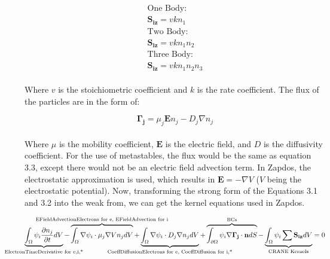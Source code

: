 \documentclass[final]{report}
\begin{document}
  \begin{equation}
    \begin{gathered}
    \text{One Body:} \\
    \mathbf{S_{iz}}=vkn_{1} \\
    \text{Two Body:} \\
    \mathbf{S_{iz}}=vkn_{1}n_{2} \\
    \text{Three Body:} \\
    \mathbf{S_{iz}}=vkn_{1}n_{2}n_{3}
    \end{gathered}
  \end{equation}
  \\
  Where $v$ is the stoichiometric coefficient and $k$ is the rate coefficient. The flux of the particles are in the form of:

  \begin{equation}
      \mathbf{\Gamma_{j}}=\mu_{j}\mathbf{E}n_{j}-D_{j}\nabla n_{j}
  \end{equation}
  \\
  Where $\mu$ is the mobility coefficient, $\textbf{E}$ is the electric field, and $D$ is the diffusivity coefficient. For the use of metastables, the flux would be the same as equation 3.3, except there would not be an electric field advection term. In Zapdos, the electrostatic approximation is used, which results in $\textbf{E}=-\nabla V$ ($V$ being the electrostatic potential). Now, transforming the strong form of the Equations 3.1 and 3.2 into the weak from, we can get the kernel equations used in Zapdos.

  \begin{equation}
    \underbrace{\int_{\Omega}\psi_{i}\frac{\partial n_{j}}{\partial t} dV}_\text{\makebox[0pt]{ElectronTimeDerivative for e,i,*}}- \overbrace{\int_{\Omega}\nabla\psi_{i}\cdot\mu_{j}\nabla V n_{j} dV}^\text{\makebox[0pt]{EFieldAdvectionElectrons for e, EFieldAdvection for i}}+\underbrace{\int_{\Omega}\nabla\psi_{i}\cdot D_{j}\nabla n_{j} dV}_\text{\makebox[0pt]{CoeffDiffusionElectrons for e, CoeffDiffusion for i,*}}+\overbrace{\int_{\partial\Omega}\psi_{i}\nabla \mathbf{\Gamma_{j}}\cdot \mathbf{n} dS}^\text{\makebox[0pt]{BCs}}-\underbrace{\int_{\Omega}\psi_{i}\sum{\mathbf{S_{iz}}}  dV}_\text{\makebox[0pt]{CRANE Kernels}}=0
  \end{equation}
\end{document}
